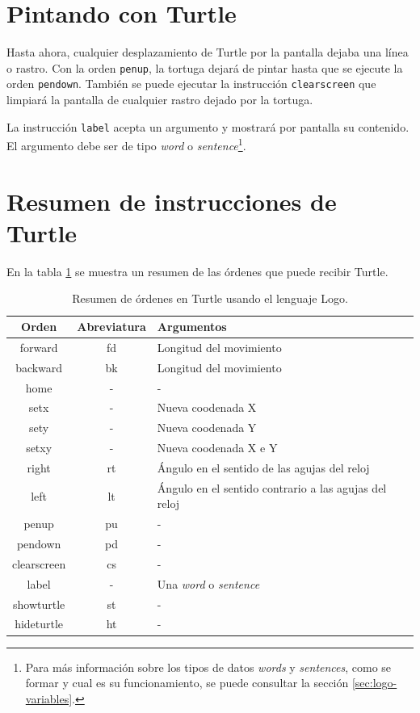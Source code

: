 \section*{Pintando con Turtle}

Hasta ahora, cualquier desplazamiento de Turtle por la pantalla dejaba una línea o rastro. Con la orden \texttt{penup}, la tortuga dejará de pintar hasta que se ejecute la orden \texttt{pendown}. También se puede ejecutar la instrucción \texttt{clearscreen} que limpiará la pantalla de cualquier rastro dejado por la tortuga.

La instrucción \texttt{label} acepta un argumento y mostrará por pantalla su contenido. El argumento debe ser de tipo \emph{word} o \emph{sentence}\footnote{Para más información sobre los tipos de datos \emph{words} y \emph{sentences}, como se formar y cual es su funcionamiento, se puede consultar la sección \ref{sec:logo-variables}.}.

\section*{Resumen de instrucciones de Turtle}


En la tabla \ref{tab:turtle-lenguaje} se muestra un resumen de las órdenes que puede recibir Turtle.

\begin{table}[!ht]
	\begin{centering}
		\begin{tabular}{c|c|l}
Orden & Abreviatura & Argumentos\\
\hline
forward & fd & Longitud del movimiento\\
backward & bk & Longitud del movimiento\\
home & - & -\\
setx & - & Nueva coodenada X\\
sety & - & Nueva coodenada Y\\
setxy & - & Nueva coodenada X e Y\\
right & rt & Ángulo en el sentido de las agujas del reloj\\
left & lt & Ángulo en el sentido contrario a las agujas del reloj\\
penup & pu & -\\
pendown & pd & -\\
clearscreen & cs & -\\
label & - & Una \emph{word} o \emph{sentence}\\
showturtle & st & -\\
hideturtle & ht & -\\
\end{tabular}
	\caption{Resumen de órdenes en Turtle usando el lenguaje Logo.}
		\label{tab:turtle-lenguaje}
	\end{centering}
\end{table}




